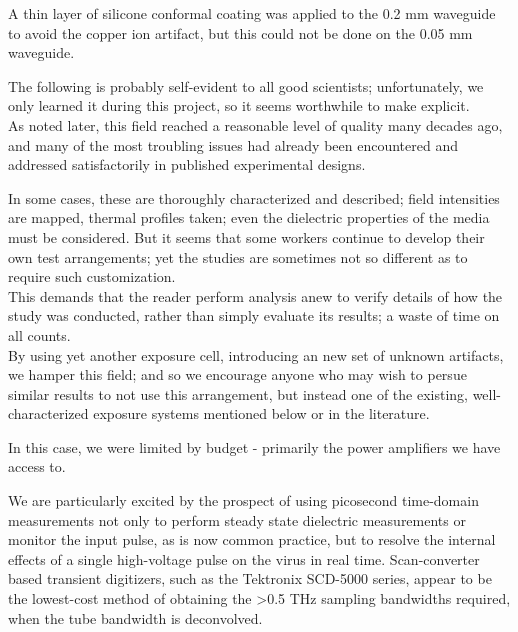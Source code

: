 \documentclass[paper.tex]{subfiles}
\begin{document}
\begin{multicols}{1}
A thin layer of silicone conformal coating was applied to the 0.2 mm waveguide to avoid the copper ion artifact, but this could not be done on the 0.05 mm waveguide.


\begin{tcolorbox}
	
	The following is probably self-evident to all good scientists; unfortunately, we only learned it during this project, so it seems worthwhile to make explicit.\\
	
	As noted later, this field reached a reasonable level of quality many decades ago, and many of the most troubling issues had already been encountered and addressed satisfactorily in published experimental designs\cite{Biological1984}. 
	
	In some cases, these are thoroughly characterized and described; field intensities are mapped, thermal profiles taken; even the dielectric properties of the media must be considered. But it seems that some workers continue to develop their own test arrangements; yet the studies are sometimes not so different as to require such customization. \\
	
	This demands that the reader perform analysis anew to verify details of how the study was conducted, rather than simply evaluate its results; a waste of time on all counts.\\
	
	By using yet another exposure cell, introducing an new set of unknown artifacts, we hamper this field; and so we encourage anyone who may wish to persue similar results to not use this arrangement, but instead one of the existing, well-characterized exposure systems mentioned below or in the literature.
	
	In this case, we were limited by budget - primarily the power amplifiers we have access to.
	
\end{tcolorbox}




We are particularly excited by the prospect of using picosecond time-domain measurements not only to perform steady state dielectric measurements or monitor the input pulse, as is now common practice, but to resolve the internal effects of a single high-voltage pulse on the virus in real time. Scan-converter based transient digitizers, such as the Tektronix SCD-5000 series, appear to be the lowest-cost method of obtaining the >0.5 THz sampling bandwidths required, when the tube bandwidth is deconvolved.


\end{multicols}
\end{document}
